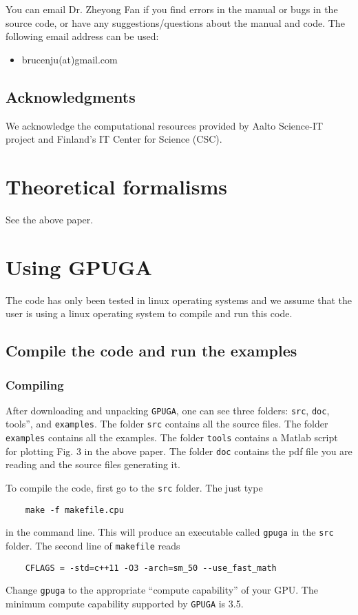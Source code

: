 \documentclass[12pt,a4paper]{report}
\begin{document}
You can email Dr. Zheyong Fan if you find errors in the manual or bugs in the source code, or have any suggestions/questions about the manual and code. The following email address can be used:
\begin{itemize}
\item brucenju(at)gmail.com
\end{itemize}


\section{Acknowledgments}
We acknowledge the computational resources provided by Aalto Science-IT project and Finland's IT Center for Science (CSC).

\chapter{Theoretical formalisms\label{section:theory}}

See the above paper. 

\chapter{Using GPUGA \label{section:usage}}

The code has only been tested in linux operating systems and we assume that the user is using a linux operating system to compile and run this code.

\section{Compile the code and run the examples}

\subsection{Compiling}

After downloading and unpacking \verb"GPUGA", one can see three folders:  \verb"src",  \verb"doc",  \verb''tools'', and \verb"examples". The folder \verb"src" contains all the source files. The folder \verb"examples" contains all the examples. The folder \verb"tools" contains a Matlab script for plotting Fig. 3 in the above paper. The folder \verb"doc" contains the pdf file you are reading and the source files generating it.

To compile the code, first go to the \verb"src" folder. The just type
\begin{verbatim}
    make -f makefile.cpu
\end{verbatim}
in the command line. This will produce an executable called \verb"gpuga" in the \verb"src" folder. The second line of \verb"makefile" reads
\begin{verbatim}
    CFLAGS = -std=c++11 -O3 -arch=sm_50 --use_fast_math
\end{verbatim}
Change \verb"gpuga" to the appropriate ``compute capability'' of your GPU. The minimum compute capability supported by \verb"GPUGA" is 3.5.
\end{document}

